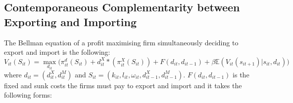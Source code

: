 \documentclass[12pt]{article}
\begin{document}
  
% 
% 

 \newpage
\subsection{Contemporaneous Complementarity between Exporting and Importing}\label{sec:biprobit}

The Bellman equation of a profit maximising firm simultaneously deciding to export
and import  is the following:  
\begin{equation}
V_{it}(S_{it}) = \underset{d_{it}}{\max} \big(\pi_{it}^{d}(S_{it}) +d_{it}^{X}*(\pi_{it}^{X}(S_{it})) +
F(d_{it}, d_{it-1}) + \beta \mathbb{E}(V_{it}(s_{it+1})|s_{it}, d_{it}) \big)
\end{equation}
where $d_{it}= (d_{it}^X, d_{it}^M)$ and $S_{it}= (k_{it}, l_{it},
\omega_{it}, d_{it-1}^X, d_{it-1}^M)$.  $F(d_{it}, d_{it-1})$ is the
fixed and sunk costs the firms must pay to export and import and it takes the
following forms:
\end{document}
